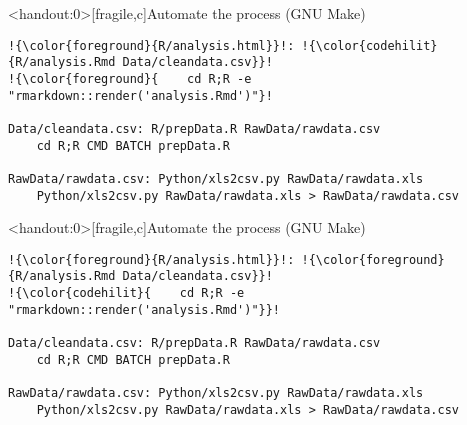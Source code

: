 \documentclass[aspectratio=169,12pt,t]{beamer}
\begin{document}
\begin{frame}<handout:0>[fragile,c]{Automate the process (GNU Make)}

\addtocounter{framenumber}{-1}

\begin{center}
\begin{minipage}[c]{13.8cm}
\begin{semiverbatim}
\lstset{basicstyle=\footnotesize}
\begin{lstlisting}[escapechar=!,linewidth=13.8cm]
!{\color{foreground}{R/analysis.html}}!: !{\color{codehilit}{R/analysis.Rmd Data/cleandata.csv}}!
!{\color{foreground}{    cd R;R -e "rmarkdown::render('analysis.Rmd')"}!

Data/cleandata.csv: R/prepData.R RawData/rawdata.csv
    cd R;R CMD BATCH prepData.R

RawData/rawdata.csv: Python/xls2csv.py RawData/rawdata.xls
    Python/xls2csv.py RawData/rawdata.xls > RawData/rawdata.csv
\end{lstlisting}
\end{semiverbatim}
\end{minipage}
\end{center}
\end{frame}



\begin{frame}<handout:0>[fragile,c]{Automate the process (GNU Make)}

\addtocounter{framenumber}{-1}

\begin{center}
\begin{minipage}[c]{13.8cm}
\begin{semiverbatim}
\lstset{basicstyle=\footnotesize}
\begin{lstlisting}[escapechar=!,linewidth=13.8cm]
!{\color{foreground}{R/analysis.html}}!: !{\color{foreground}{R/analysis.Rmd Data/cleandata.csv}}!
!{\color{codehilit}{    cd R;R -e "rmarkdown::render('analysis.Rmd')"}}!

Data/cleandata.csv: R/prepData.R RawData/rawdata.csv
    cd R;R CMD BATCH prepData.R

RawData/rawdata.csv: Python/xls2csv.py RawData/rawdata.xls
    Python/xls2csv.py RawData/rawdata.xls > RawData/rawdata.csv
\end{lstlisting}
\end{semiverbatim}
\end{minipage}
\end{center}
\end{frame}
\end{document}
